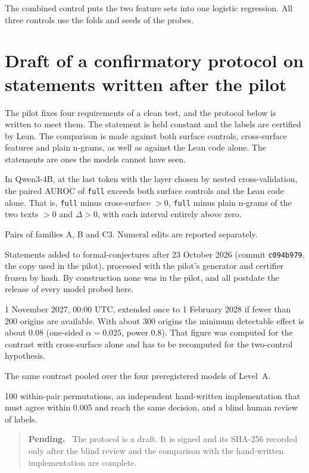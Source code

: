 \documentclass[10pt]{article}
\newcommand{\vr}[1]{\texttt{#1}}
\newcommand{\D}{\Delta}
\newenvironment{pendiente}{\begin{quote}\small\noindent\textbf{Pending.}\ }{\end{quote}}
\begin{document}
The combined control puts the two feature sets into one logistic regression. All three controls use the folds and
seeds of the probes.

\section{Draft of a confirmatory protocol on statements written after the pilot}\label{app:protocolo}

The pilot fixes four requirements of a clean test, and the protocol below is written to meet them. The statement is
held constant and the labels are certified by Lean. The comparison is made against both surface controls,
cross-surface features and plain n-grams, as well as against the Lean code alone. The statements are ones the models cannot
have seen.

\begin{description}[leftmargin=1.2em]
\item[Hypothesis] In Qwen3-4B, at the last token with the layer chosen by nested cross-validation, the paired
AUROC of \vr{full} exceeds both surface controls and the Lean code alone. That is, \vr{full} minus cross-surface $> 0$, \vr{full} minus plain n-grams of the two texts $> 0$ and $\D > 0$, with each interval entirely above zero.
\item[Population] Pairs of families A, B and C3. Numeral edits are reported separately.
\item[Data] Statements added to formal-conjectures after 23 October 2026 (commit \vr{c094b979}, the copy used in the pilot),
processed with the pilot's generator and certifier frozen by hash. By construction none was in the pilot, and all
postdate the release of every model probed here.
\item[Snapshot] 1 November 2027, 00:00 UTC, extended once to 1 February 2028 if fewer than 200 origins are
available. With about 300 origins the minimum detectable effect is about 0.08 (one-sided $\alpha = 0.025$, power
0.8). That figure was computed for the contrast with cross-surface alone and has to be recomputed for the
two-control hypothesis.
\item[Replication] The same contrast pooled over the four preregistered models of Level~A.
\item[Checks] 100 within-pair permutations, an independent hand-written implementation that must agree within
0.005 and reach the same decision, and a blind human review of labels.
\end{description}

\begin{pendiente}
The protocol is a draft. It is signed and its SHA-256 recorded only after the blind review and the comparison with
the hand-written implementation are complete.
\end{pendiente}

\end{document}

